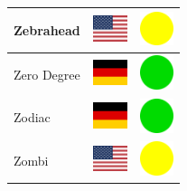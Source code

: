 \documentclass[12pt, a4paper, twoside]{report}
\begin{document}
\begin{center}
\begin{longtable}{|p{5cm}|p{2cm}|p{2cm}|}
Zebrahead & \includegraphics[width=1cm]{4x3/us} & \includegraphics[width=1cm]{likes/m} \\ \hline
Zero Degree & \includegraphics[width=1cm]{4x3/de} & \includegraphics[width=1cm]{likes/y} \\ \hline
Zodiac & \includegraphics[width=1cm]{4x3/de} & \includegraphics[width=1cm]{likes/y} \\ \hline
Zombi & \includegraphics[width=1cm]{4x3/us} & \includegraphics[width=1cm]{likes/m} \\ \hline
		\end{longtable}
	\end{center}
\end{document}
